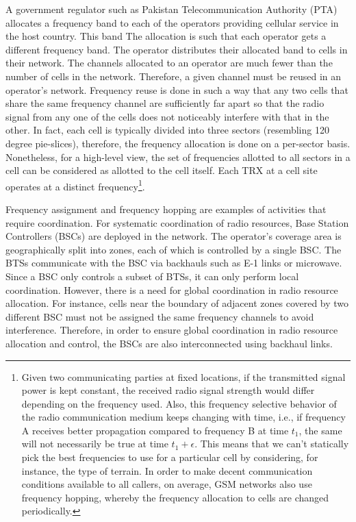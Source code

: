 A government regulator such as Pakistan Telecommunication Authority (PTA) allocates a frequency band to each of the operators providing cellular service in the host country. This band The allocation is such that each operator gets a different frequency band. The operator distributes their allocated band to cells in their network. The channels allocated to an operator are much fewer than the number of cells in the network. Therefore, a given channel must be reused in an operator's network. Frequency reuse is done in such a way that any two cells that share the same frequency channel are sufficiently far apart so that the radio signal from any one of the cells does not noticeably interfere with that in the other. In fact, each cell is typically divided into three sectors (resembling 120 degree pie-slices), therefore, the frequency allocation is done on a per-sector basis. Nonetheless, for a high-level view, the set of frequencies allotted to all sectors in a cell can be considered as allotted to the cell itself. Each TRX at a cell site operates at a distinct frequency\footnote{Given two communicating parties at fixed locations, if the transmitted signal power is kept constant, the received radio signal strength would differ depending on the frequency used. Also, this frequency selective behavior of the radio communication medium keeps changing with time, i.e., if frequency A receives better propagation compared to frequency B at time $t_1$, the same will not necessarily be true at time $t_1+\epsilon$. This means that we can't statically pick the best frequencies to use for a particular cell by considering, for instance, the type of terrain. In order to make decent communication conditions available to all callers, on average, GSM networks also use frequency hopping, whereby the frequency allocation to cells are changed periodically.}. 

Frequency assignment and frequency hopping are examples of activities that require coordination. For systematic coordination of radio resources, Base Station Controllers (BSCs) are deployed in the network. The operator's coverage area is geographically split into zones, each of which is controlled by a single BSC. The BTSs communicate with the BSC via backhauls such as E-1 links or microwave. Since a BSC only controls a subset of BTSs, it can only perform local coordination. However, there is a need for global coordination in radio resource allocation. For instance, cells near the boundary of adjacent zones covered by two different BSC must not be assigned the same frequency channels to avoid interference. Therefore, in order to ensure global coordination in radio resource allocation and control, the BSCs are also interconnected using backhaul links.

